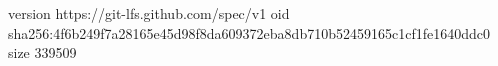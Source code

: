 version https://git-lfs.github.com/spec/v1
oid sha256:4f6b249f7a28165e45d98f8da609372eba8db710b52459165c1cf1fe1640ddc0
size 339509
